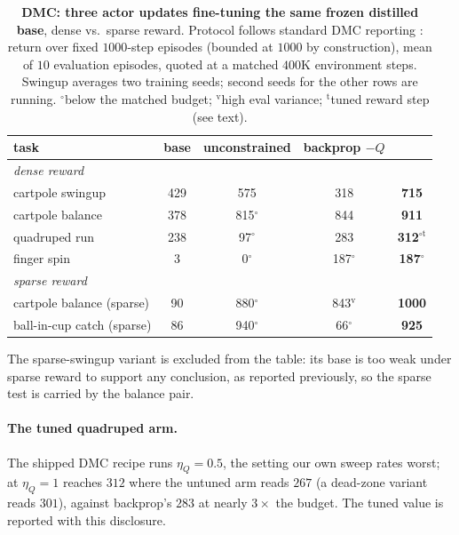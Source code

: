 \begin{table}[t]
\centering
\caption{\textbf{DMC: three actor updates fine-tuning the same frozen
distilled base}, dense vs.\ sparse reward. Protocol follows standard DMC
reporting \citep{tassa2018dmc}: return over fixed $1000$-step episodes
(bounded at $1000$ by construction), mean of $10$ evaluation episodes,
quoted at a matched $400$K environment steps. Swingup averages two training
seeds; second seeds for the other rows are running.
$^{\circ}$below the matched budget; $^{\mathrm{v}}$high eval variance;
$^{\mathrm{t}}$tuned reward step (see text).}
\label{tab:dmc-scope}
\small
\begin{tabular}{lcccc}
\toprule
task & base & unconstrained & backprop $-Q$ & \method{} \\
\midrule
\multicolumn{5}{l}{\emph{dense reward}} \\
cartpole swingup      & 429 & 575 & 318 & \textbf{715} \\
cartpole balance      & 378 & 815$^{\circ}$ & 844 & \textbf{911} \\
quadruped run         & 238 & 97$^{\circ}$ & 283 & \textbf{312}$^{\circ\mathrm{t}}$ \\
finger spin           & 3   & 0$^{\circ}$ & 187$^{\circ}$ & \textbf{187}$^{\circ}$ \\
\midrule
\multicolumn{5}{l}{\emph{sparse reward}} \\
cartpole balance (sparse) & 90  & 880$^{\circ}$ & 843$^{\mathrm{v}}$ & \textbf{1000} \\
ball-in-cup catch (sparse) & 86 & 940$^{\circ}$ & 66$^{\circ}$ & \textbf{925} \\
\bottomrule
\end{tabular}
\end{table}

The sparse-swingup variant is excluded from the table: its base is too
weak under sparse reward to support any conclusion, as reported previously,
so the sparse test is carried by the balance pair.

\paragraph{The tuned quadruped arm.} The shipped DMC recipe runs
$\eta_Q{=}0.5$, the setting our own sweep rates worst; at $\eta_Q{=}1$
\method{} reaches $312$ where the untuned arm reads $267$ (a dead-zone
variant reads $301$), against backprop's $283$ at nearly $3\times$ the
budget. The tuned value is reported with this disclosure.

